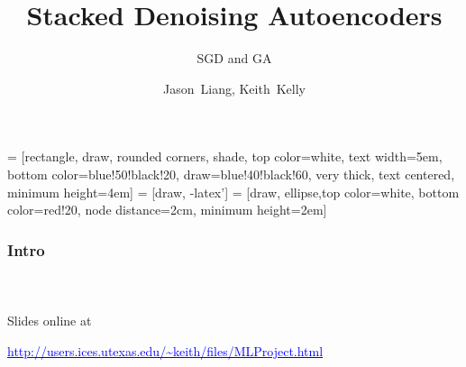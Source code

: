 \documentclass[mathserif,18pt,xcolor=table]{beamer}
\title{Stacked Denoising Autoencoders}
\subtitle{SGD and GA}
\author[Jason Liang and Keith Kelly]{ {Jason~Liang, Keith~Kelly} \\  
}
\institute{UT-Austin\\ \mbox{}  \\  \pgfuseimage{utbig} }
\date[ACHA]
\begin{document}
 = [rectangle, draw, rounded corners, shade, top color=white, text width=5em,
  bottom color=blue!50!black!20, draw=blue!40!black!60, very thick, text centered, minimum height=4em]
   = [draw, -latex']
   = [draw, ellipse,top color=white, bottom color=red!20, node distance=2cm, minimum height=2em]


  \beamertemplateballitem

  \frame{\titlepage}



\begin{frame}[t]
\frametitle{Intro}
\framesubtitle{~~}  %

Slides online at

\href{http://users.ices.utexas.edu/~keith/files/MLProject.html}{\textcolor{blue}{http://users.ices.utexas.edu/\textasciitilde keith/files/MLProject.html}}


\end{frame}





\end{document}
